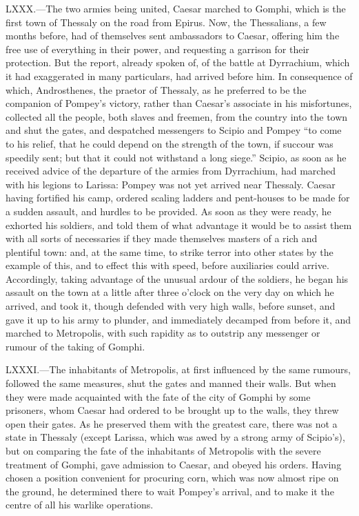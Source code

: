 LXXX.—The two armies being united, Caesar marched to Gomphi, which is
the first town of Thessaly on the road from Epirus. Now, the
Thessalians, a few months before, had of themselves sent ambassadors to
Caesar, offering him the free use of everything in their power, and
requesting a garrison for their protection. But the report, already
spoken of, of the battle at Dyrrachium, which it had exaggerated in many
particulars, had arrived before him. In consequence of which,
Androsthenes, the praetor of Thessaly, as he preferred to be the
companion of Pompey's victory, rather than Caesar's associate in his
misfortunes, collected all the people, both slaves and freemen, from the
country into the town and shut the gates, and despatched messengers to
Scipio and Pompey ``to come to his relief, that he could depend on the
strength of the town, if succour was speedily sent; but that it could
not withstand a long siege.'' Scipio, as soon as he received advice of
the departure of the armies from Dyrrachium, had marched with his
legions to Larissa: Pompey was not yet arrived near Thessaly. Caesar
having fortified his camp, ordered scaling ladders and pent-houses to be
made for a sudden assault, and hurdles to be provided. As soon as they
were ready, he exhorted his soldiers, and told them of what advantage it
would be to assist them with all sorts of necessaries if they made
themselves masters of a rich and plentiful town: and, at the same time,
to strike terror into other states by the example of this, and to effect
this with speed, before auxiliaries could arrive. Accordingly, taking
advantage of the unusual ardour of the soldiers, he began his assault on
the town at a little after three o'clock on the very day on which he
arrived, and took it, though defended with very high walls, before
sunset, and gave it up to his army to plunder, and immediately decamped
from before it, and marched to Metropolis, with such rapidity as to
outstrip any messenger or rumour of the taking of Gomphi.

LXXXI.—The inhabitants of Metropolis, at first influenced by the same
rumours, followed the same measures, shut the gates and manned their
walls. But when they were made acquainted with the fate of the city of
Gomphi by some prisoners, whom Caesar had ordered to be brought up to
the walls, they threw open their gates. As he preserved them with the
greatest care, there was not a state in Thessaly (except Larissa, which
was awed by a strong army of Scipio's), but on comparing the fate of the
inhabitants of Metropolis with the severe treatment of Gomphi, gave
admission to Caesar, and obeyed his orders. Having chosen a position
convenient for procuring corn, which was now almost ripe on the ground,
he determined there to wait Pompey's arrival, and to make it the centre
of all his warlike operations.


